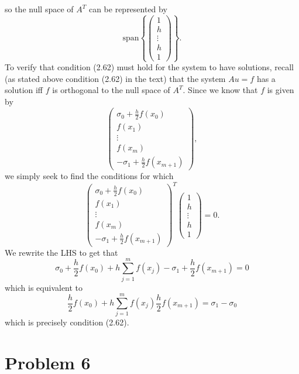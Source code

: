 \documentclass{article}
\begin{document}
so the null space of $A^T$ can be represented by 
\[
\text{span}\left\{\begin{pmatrix}
1\\h\\ \vdots \\ h\\ 1
\end{pmatrix}\right\}.
\]
To verify that condition (2.62) must hold for the system to have solutions, recall (as stated above condition (2.62) in the text) that the system $Au=f$ has a solution iff $f$ is orthogonal to the null space of $A^T$. Since we know that $f$ is given by 
\[
\begin{pmatrix}
\sigma_0+\frac{h}{2}f(x_0)\\f(x_1)\\\vdots\\f(x_m)\\-\sigma_1+\frac{h}{2}f(x_{m+1})
\end{pmatrix},
\]
we simply seek to find the conditions for which 
\[
\begin{pmatrix}
\sigma_0+\frac{h}{2}f(x_0)\\f(x_1)\\\vdots\\f(x_m)\\-\sigma_1+\frac{h}{2}f(x_{m+1})
\end{pmatrix}^T\begin{pmatrix}
1\\h\\ \vdots \\ h\\ 1
\end{pmatrix}=0.
\]
We rewrite the LHS to get that 
\[
\sigma_0+\frac{h}{2}f(x_0)+h\sum_{j=1}^mf(x_j)-\sigma_1+\frac{h}{2}f(x_{m+1})=0
\]
which is equivalent to 
\[
\frac{h}{2}f(x_0)+h\sum_{j=1}^mf(x_j)\frac{h}{2}f(x_{m+1})=\sigma_1-\sigma_0
\]
which is precisely condition (2.62).

\section{Problem 6}
\end{document}
